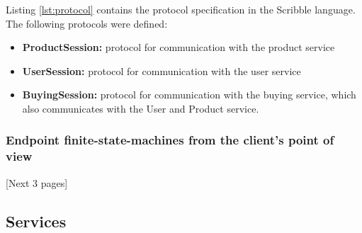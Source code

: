 \documentclass{article}
\newcommand{\namedlisting}[2][]{%
}
\newcommand*\lstinputpath[1]{\lstset{inputpath=#1}}
\begin{document}
\lstinputpath{../webshop-distributed/common/src/main/scribble/}

Listing \ref{lst:protocol} contains the protocol specification in the Scribble language. The following protocols were defined:

\begin{itemize}
    \item \textbf{ProductSession:} protocol for communication with the product service
    
    \item \textbf{UserSession:} protocol for communication with the user service
    
    \item \textbf{BuyingSession:} protocol for communication with the buying service, which also communicates with the User and Product service.
\end{itemize}

\namedlisting[label={lst:protocol}]{Webshop.scr}

\subsubsection{Endpoint finite-state-machines from the client's point of view}

[Next 3 pages]



    
\subsection {Services}
  
\end{document}
